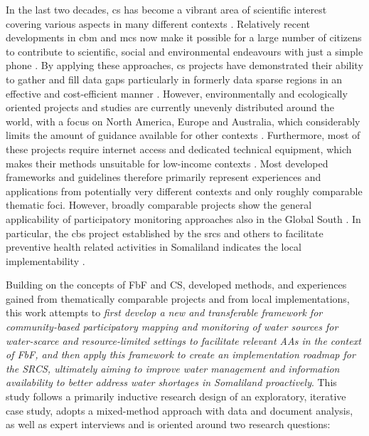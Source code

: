 In the last two decades, \acrfull{cs} has become a vibrant area of scientific interest covering various aspects in many different contexts \autocite{kirschkeCitizenScienceProjects2022,kullenbergWhatCitizenScience2016}. Relatively recent developments in \acrlong{cbm} and \acrlong{mcs} now make it possible for a large number of citizens to contribute to scientific, social and environmental endeavours with just a simple phone \autocite{butteFrameworkWaterSecurity2022}. By applying these approaches, \acrshort{cs} projects have demonstrated their ability to gather and fill data gaps particularly in formerly data sparse regions in an effective and cost-efficient manner \autocite{butteFrameworkWaterSecurity2022,lackstromBackyardHydroclimatologyCitizen2022,weeserCitizenSciencePioneers2018a}. However, environmentally and ecologically oriented projects and studies are currently unevenly distributed around the world, with a focus on North America, Europe and Australia, which considerably limits the amount of guidance available for other contexts \autocite{kirschkeCitizenScienceProjects2022, koehlerCitizenParticipationCollaborative2008, livinglakescanadaElevatingCommunityBased2018}. Furthermore, most of these projects require internet access and dedicated technical equipment, which makes their methods unsuitable for low-income contexts \autocite{fienenSocialWaterCrowdsourcing2012a,lackstromBackyardHydroclimatologyCitizen2022,lowryGrowingPainsCrowdsourced2019}.\newline
Most developed frameworks and guidelines therefore primarily represent experiences and applications from potentially very different contexts and only roughly comparable thematic foci. However, broadly comparable projects show the general applicability of participatory monitoring approaches also in the Global South \autocite{gualazziniEWEAEarlyWarning2021,ifrcCommunityBasedSurveillanceGuiding2017,ochaANTICIPATORYACTIONPLAN2020,weeserCitizenSciencePioneers2018a}. In particular, the \acrlong{cbs} project established by the \acrshort{srcs} and others to facilitate preventive health related activities in Somaliland indicates the local implementability \autocite{ifrcCommunityBasedSurveillanceGuiding2017,scrsFeasibilityStudyPotential2022}.

Building on the concepts of FbF and CS, developed methods, and experiences gained from thematically comparable projects and from local implementations, this work attempts to \textit{first develop a new and transferable framework for community-based participatory mapping and monitoring of water sources for water-scarce and resource-limited settings to facilitate relevant AAs in the context of FbF, and then apply this framework to create an implementation roadmap for the SRCS, ultimately aiming to improve water management and information availability to better address water shortages in Somaliland proactively}.\newline
This study follows a primarily inductive research design of an exploratory, iterative case study, adopts a mixed-method approach with data and document analysis, as well as expert interviews and is oriented around two research questions:

